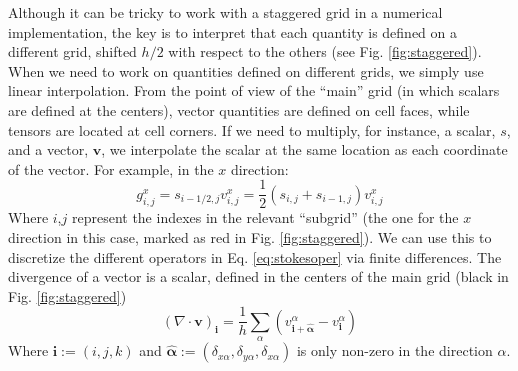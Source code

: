 \documentclass[ twoside,openright,titlepage,numbers=noenddot,%
headinclude,footinclude,cleardoublepage=empty,abstract=on,
BCOR=5mm,paper=b5,fontsize=11pt, dvipsnames
]{scrreprt}
\renewcommand{\vec}[1]{\bm{#1}}
\newcommand{\half}{\frac{1}{2}}
\begin{document}
Although it can be tricky to work with a staggered grid in a numerical implementation, the key is to interpret that each quantity is defined on a different grid, shifted $h/2$ with respect to the others (see Fig. \ref{fig:staggered}). When we need to work on quantities defined on different grids, we simply use linear interpolation.
From the point of view of the ``main'' grid (in which scalars are defined at the centers), vector quantities are defined on cell faces, while tensors are located at cell corners. If we need to multiply, for instance, a scalar, $s$, and a vector, $\vec{v}$, we interpolate the scalar at the same location as each coordinate of the vector. For example, in the $x$ direction:
\begin{equation}
  g^x_{i,j} = s_{i-1/2,j} v^x_{i,j} = \half( s_{i,j} + s_{i-1,j})v^x_{i,j}
\end{equation}
Where $i$,$j$ represent the indexes in the relevant ``subgrid'' (the one for the $x$ direction in this case, marked as red in Fig. \ref{fig:staggered}).
We can use this to discretize the different operators in Eq. \eqref{eq:stokesoper} via finite differences.
The divergence of a vector is a scalar, defined in the centers of the main grid (black in Fig. \ref{fig:staggered})
\begin{equation}
  \label{eq:staggereddiv}
  (\nabla\cdot\vec{v})_{\vec{i}} = \frac{1}{h}\sum_\alpha(v^\alpha_{\vec{i} + \vec{\hat{\alpha}}} - v^\alpha_{\vec{i}})
\end{equation}
Where $\vec{i}:=(i,j,k)$ and $\vec{\hat{\alpha}}:=(\delta_{x\alpha}, \delta_{y\alpha}, \delta_{x\alpha})$ is only non-zero in the direction $\alpha$.
\end{document}
